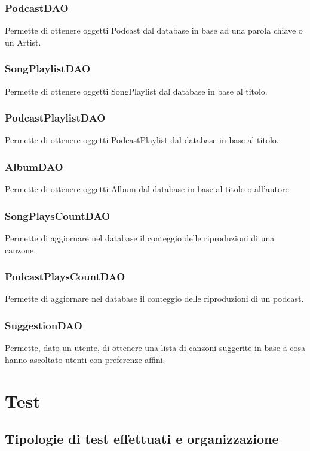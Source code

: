 \documentclass{article}
\begin{document}
  \subsubsection{PodcastDAO}
  Permette di ottenere oggetti Podcast dal database in base ad una parola chiave o un Artist.

  \subsubsection{SongPlaylistDAO}
  Permette di ottenere oggetti SongPlaylist dal database in base al titolo.

  \subsubsection{PodcastPlaylistDAO}
  Permette di ottenere oggetti PodcastPlaylist dal database in base al titolo.

  \subsubsection{AlbumDAO}
  Permette di ottenere oggetti Album dal database in base al titolo o all'autore

  \subsubsection{SongPlaysCountDAO}
  Permette di aggiornare nel database il conteggio delle riproduzioni di una canzone.

  \subsubsection{PodcastPlaysCountDAO}
  Permette di aggiornare nel database il conteggio delle riproduzioni di un podcast.

  \subsubsection{SuggestionDAO}
  Permette, dato un utente, di ottenere una lista di canzoni suggerite in base a cosa hanno ascoltato utenti con preferenze affini.


  \section{Test}

  \subsection{Tipologie di test effettuati e organizzazione}
\end{document}
